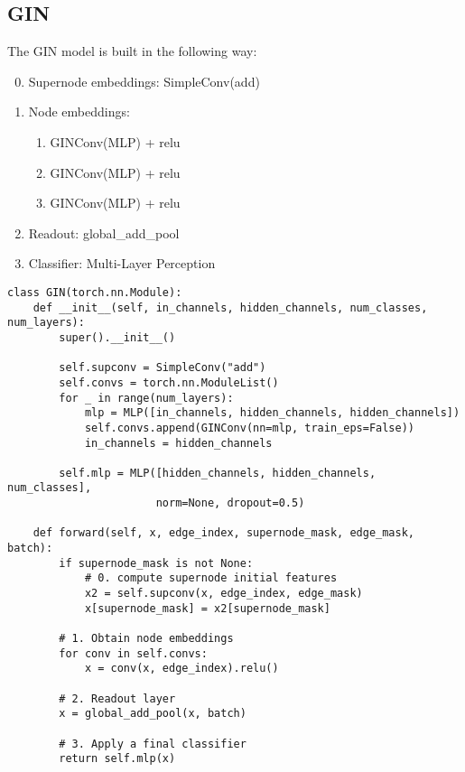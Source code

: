 \documentclass{article}
\begin{document}
    \subsection{GIN}
    \begin{definition}
        The GIN model is built in the following way:
        \begin{enumerate}
        \setcounter{enumi}{-1}
            \item Supernode embeddings: SimpleConv(add)
            \item Node embeddings:
                \begin{enumerate}
                    \item GINConv(MLP) + relu
                    \item GINConv(MLP) + relu
                    \item GINConv(MLP) + relu
                \end{enumerate}
            \item Readout: global\_add\_pool
            \item Classifier: Multi-Layer Perception
        \end{enumerate}
    \end{definition}

    \begin{code}
        \noindent
        \begin{lstlisting}
class GIN(torch.nn.Module):
    def __init__(self, in_channels, hidden_channels, num_classes, num_layers):
        super().__init__()

        self.supconv = SimpleConv("add")
        self.convs = torch.nn.ModuleList()
        for _ in range(num_layers):
            mlp = MLP([in_channels, hidden_channels, hidden_channels])
            self.convs.append(GINConv(nn=mlp, train_eps=False))
            in_channels = hidden_channels

        self.mlp = MLP([hidden_channels, hidden_channels, num_classes],
                       norm=None, dropout=0.5)

    def forward(self, x, edge_index, supernode_mask, edge_mask, batch):
        if supernode_mask is not None:
            # 0. compute supernode initial features
            x2 = self.supconv(x, edge_index, edge_mask)
            x[supernode_mask] = x2[supernode_mask]

        # 1. Obtain node embeddings
        for conv in self.convs:
            x = conv(x, edge_index).relu()

        # 2. Readout layer
        x = global_add_pool(x, batch)

        # 3. Apply a final classifier
        return self.mlp(x)
        \end{lstlisting}
    \end{code}
\end{document}
